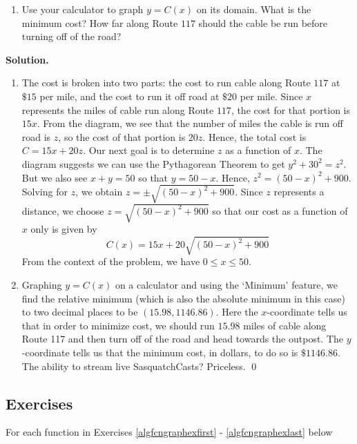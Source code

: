 \begin{ex}
\begin{enumerate}
\item  Use your calculator to graph $y=C(x)$ on its domain.  What is the minimum cost?  How far along Route $117$ should the cable be run before turning off of the road?

\end{enumerate}

{\bf Solution.}

\begin{enumerate}

\item  The cost is broken into two parts:  the cost to run cable along Route $117$ at $\$15$ per mile, and the cost to run it off road at $\$20$ per mile.  Since $x$ represents the miles of cable run along Route $117$, the cost  for that portion is $15x$.  From the diagram, we see that the number of miles the cable is run off road is $z$, so the cost of that portion is $20z$.  Hence, the total cost is $C = 15x + 20z$.  Our next goal is to determine $z$ as a function of $x$.  The diagram suggests we can use the Pythagorean Theorem to get $y^2+30^2 = z^2$.  But we also see $x+y = 50$ so that $y=50-x$.  Hence, $z^2 = (50-x)^2+900$.  Solving for $z$, we obtain $z = \pm \sqrt{(50-x)^2+900}$.  Since $z$ represents a distance, we choose $z = \sqrt{(50-x)^2+900}$ so that our cost as a function of $x$ only is given by \[C(x) = 15x + 20\sqrt{(50-x)^2+900}\] From the context of the problem, we have $0 \leq x \leq 50$.

\item  Graphing $y=C(x)$ on a calculator and using the `Minimum' feature, we find the relative minimum (which is also the absolute minimum in this case) to two decimal places to be $(15.98, 1146.86)$.  Here the $x$-coordinate tells us that in order to minimize cost, we should run $15.98$ miles of cable along Route 117 and then turn off of the road and head towards the outpost. The $y$-coordinate tells us that the minimum cost, in dollars, to do so is $\$1146.86$.  The ability to stream live SasquatchCasts?  Priceless. \qed

\end{enumerate}

\end{ex}

\newpage

\subsection{Exercises}

For each function in Exercises \ref{algfcngraphexfirst} - \ref{algfcngraphexlast} below 

